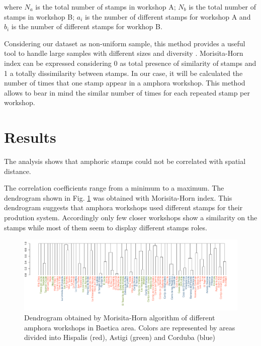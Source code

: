 \documentclass[review]{elsarticle}
\begin{document}
where $N_{a}$ is the total number of stamps in workshop A; $N_{b}$ is the total number of stamps in workshop B; $a_{i}$ is the number of different stamps for workshop A and $b_{i}$ is the number of different stamps for workhop B.

Considering our dataset as non-uniform sample, this method provides a useful tool to handle large samples with different sizes and diversity \citep{wolda_similarity_1981}. Morisita-Horn index can be expressed considering 0 as total presence of similarity of stamps and 1 a totally dissimilarity between stamps. In our case, it will be calculated the number of times that one stamp appear in a amphora workshop. This method allows to bear in mind the similar number of times for each repeated stamp per workshop. 


\section{Results}

The analysis shows that amphoric stamps could not be correlated with spatial distance. 

The correlation coefficients range from a minimum to a maximum. The dendrogram shown in Fig. \ref{dendro} was obtained with Morisita-Horn index. This dendrogram suggests that amphora workshops used different stamps for their prodution system. Accordingly only few closer workshops show a similarity on the stamps while most of them seem to display different stamps roles. 

\begin{figure}[htp]
	\centering
\includegraphics[width=\linewidth]{figs/dendro}
\caption{Dendrogram obtained by Morisita-Horn algorithm of different amphora workshops in Baetica area. Colors are represented by areas divided into Hispalis (red), Astigi (green) and Corduba (blue)}
\label{dendro}
\end{figure} 
\end{document}
